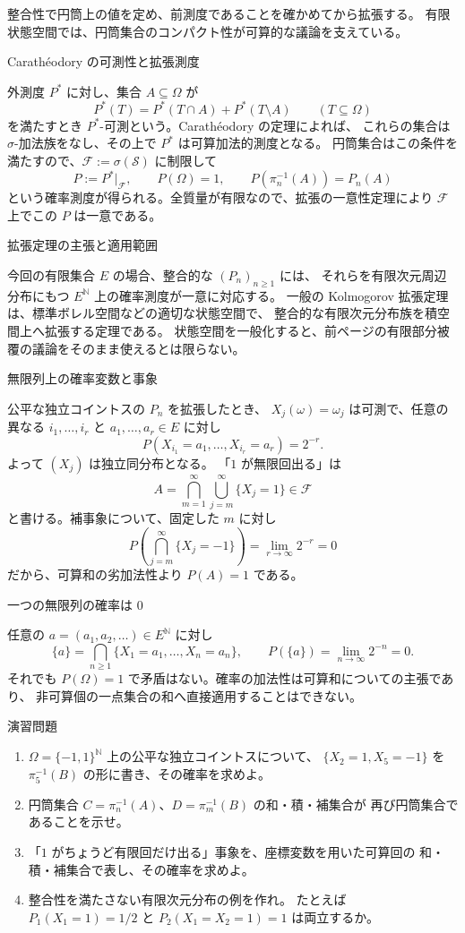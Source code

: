 \documentclass[a4paper,10pt,pdflatex,ja=standard,jafont=ipaex-type1,
  magstyle=real,scale=1]{bxjsarticle}
\newcommand{\topic}[1]{\par\vspace{5pt}
  {\large\sffamily\mdseries\color{accent}#1}\par\vspace{2pt}}
\newcommand{\keybox}[1]{\par\vspace{3pt}\begingroup
  \setlength{\fboxsep}{5pt}
  \colorbox{soft}{\parbox{\dimexpr\linewidth-2\fboxsep\relax}{#1}}%
  \endgroup\par\vspace{2pt}}
\newcommand{\F}{\mathcal F}
\newcommand{\N}{\mathbb N}
\begin{document}
\keybox{整合性で円筒上の値を定め、前測度であることを確かめてから拡張する。
有限状態空間では、円筒集合のコンパクト性が可算的な議論を支えている。}

\newpage
\topic{Carath\'eodory の可測性と拡張測度}
外測度 $P^*$ に対し、集合 $A\subseteq\Omega$ が
$$P^*(T)=P^*(T\cap A)+P^*(T\setminus A)\qquad(T\subseteq\Omega)$$
を満たすとき $P^*$-可測という。Carath\'eodory の定理によれば、
これらの集合は $\sigma$-加法族をなし、その上で $P^*$ は可算加法的測度となる。
円筒集合はこの条件を満たすので、$\F:=\sigma(\mathcal S)$ に制限して
$$P:=P^*|_\F,\qquad P(\Omega)=1,\qquad
  P(\pi_n^{-1}(A))=P_n(A)$$
という確率測度が得られる。全質量が有限なので、拡張の一意性定理により
$\F$ 上でこの $P$ は一意である。

\topic{拡張定理の主張と適用範囲}
今回の有限集合 $E$ の場合、整合的な $(P_n)_{n\ge1}$ には、
それらを有限次元周辺分布にもつ $E^\N$ 上の確率測度が一意に対応する。
一般の Kolmogorov 拡張定理は、標準ボレル空間などの適切な状態空間で、
整合的な有限次元分布族を積空間上へ拡張する定理である。
状態空間を一般化すると、前ページの有限部分被覆の議論をそのまま使えるとは限らない。

\topic{無限列上の確率変数と事象}
公平な独立コイントスの $P_n$ を拡張したとき、
$X_j(\omega)=\omega_j$ は可測で、任意の異なる $i_1,\ldots,i_r$ と
$a_1,\ldots,a_r\in E$ に対し
$$P(X_{i_1}=a_1,\ldots,X_{i_r}=a_r)=2^{-r}.$$
よって $(X_j)$ は独立同分布となる。
「$1$ が無限回出る」は
$$A=\bigcap_{m=1}^\infty\bigcup_{j=m}^\infty\{X_j=1\}\in\F$$
と書ける。補事象について、固定した $m$ に対し
$$P\left(\bigcap_{j=m}^\infty\{X_j=-1\}\right)
 =\lim_{r\to\infty}2^{-r}=0$$
だから、可算和の劣加法性より $P(A)=1$ である。

\topic{一つの無限列の確率は $0$}
任意の $a=(a_1,a_2,\ldots)\in E^\N$ に対し
$$\{a\}=\bigcap_{n\ge1}\{X_1=a_1,\ldots,X_n=a_n\},\qquad
  P(\{a\})=\lim_{n\to\infty}2^{-n}=0.$$
それでも $P(\Omega)=1$ で矛盾はない。確率の加法性は可算和についての主張であり、
非可算個の一点集合の和へ直接適用することはできない。

\newpage
\topic{演習問題}
\begin{enumerate}[label=\arabic*.]
\item $\Omega=\{-1,1\}^\N$ 上の公平な独立コイントスについて、
$\{X_2=1,X_5=-1\}$ を $\pi_5^{-1}(B)$ の形に書き、その確率を求めよ。
\item 円筒集合 $C=\pi_n^{-1}(A)$、$D=\pi_m^{-1}(B)$ の和・積・補集合が
再び円筒集合であることを示せ。
\item 「$1$ がちょうど有限回だけ出る」事象を、座標変数を用いた可算回の
和・積・補集合で表し、その確率を求めよ。
\item 整合性を満たさない有限次元分布の例を作れ。
たとえば $P_1(X_1=1)=1/2$ と $P_2(X_1=X_2=1)=1$ は両立するか。
\end{enumerate}
\end{document}
